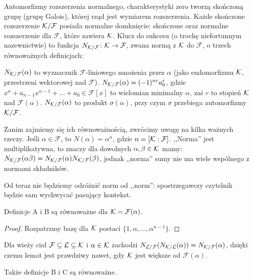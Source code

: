 Automorfizmy rozszerzenia normalnego, charakterystyki zero tworzą skończoną grupę (grupę Galois), której rząd jest wymiarem rozszerzenia.
Każde skończone rozszerzenie $\mathcal K/\mathcal F$ posiada {normalne domknięcie}: skończone oraz normalne rozszerzenie dla $\mathcal F$, które zawiera $\mathcal K$.
Klucz do sukcesu (o trochę niefortunnym nazewnictwie) to funkcja $N_{\mathcal K/\mathcal F} \colon \mathcal K \to \mathcal F$, zwana normą z $\mathcal K$ do $\mathcal F$, o trzech równoważnych definicjach:

\begin{definicja}
	$N_{\mathcal K/ \mathcal F}(\alpha)$ to wyznacznik $\mathcal F$-liniowego mnożenia przez $\alpha$ (jako endomorfizmu $\mathcal K$, przestrzeni wektorowej nad $\mathcal F$).
	$N_{\mathcal K/\mathcal F}(\alpha) = (-1)^{nr} a_0^r$, gdzie $x^n + a_{n-1}x^{n-1} + \dots  + a_0 \in \mathcal F[x]$ to wielomian minimalny $\alpha$, zaś $r$ to stopień $\mathcal K$ nad $\mathcal F(\alpha)$.
	$N_{\mathcal K/\mathcal F}(\alpha)$ to produkt $\sigma(\alpha)$, przy czym $\sigma$ przebiega automorfizmy $\mathcal K / \mathcal F$.
\end{definicja}

Zanim zajmiemy się ich równoważnością, zwrócimy uwagę na kilka ważnych rzeczy.
Jeśli $\alpha \in \mathcal F$, to $N(\alpha) = \alpha^n$, gdzie $n = [\mathcal K : \mathcal F]$.
,,Norma'' jest multiplikatywna, to znaczy dla dowolnych $\alpha, \beta \in \mathcal K$ mamy: $N_{\mathcal K / \mathcal F}(\alpha \beta) = N_{\mathcal K / \mathcal F}(\alpha) N_{\mathcal K / \mathcal F}(\beta)$, jednak ,,norma'' sumy nie ma wiele wspólnego z normami składników.

Od teraz nie będziemy odróżnić norm od ,,norm'': spostrzegawczy czytelnik będzie sam wychwycać pasujący kontekst.

\begin{lemat}
	Definicje A i B są równoważne dla $\mathcal K = \mathcal F(\alpha)$.
\end{lemat}

\begin{proof}
	Rozpatrzmy bazę dla $\mathcal K$ postaci $\{1, \alpha, \dots, \alpha^{n-1}\}$.
\end{proof}

Dla wieży ciał $\mathcal F \subseteq \mathcal L \subseteq \mathcal K$ i $\alpha \in \mathcal K$ zachodzi $N_{\mathcal L / \mathcal F}(N_{\mathcal K / \mathcal L} (\alpha)) = N_{\mathcal K / \mathcal F}(\alpha)$, dzięki czemu lemat jest prawdziwy nawet, gdy $\mathcal K$ jest większe od $\mathcal F(\alpha)$.

\begin{lemat}
	Także definicje B i C są równoważne.
\end{lemat}

